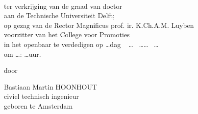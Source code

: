 \begin{titlepage}
  \begin{center}
    \hfill
    
    \vspace{2cm}
    
    \begingroup
    \color{Maroon} \\ \bigskip
    \endgroup
    
    \vfill
    
    
    \vfill
    
    ter verkrijging van de graad van doctor \\
    aan de Technische Universiteit Delft; \\
    op gezag van de Rector Magnificus prof. ir. K.Ch.A.M. Luyben \\
    voorzitter van het College voor Promoties \\
    in het openbaar te verdedigen op \dots dag ~ \dots ~ \dots\dots ~ \dots \\
    om \dots : \dots uur.
    
    \vfill
    
    door
    
    \vfill
    
    Bastiaan Martin HOONHOUT \\
    civiel technisch ingenieur \\
    geboren te Amsterdam
    
    \vfill                      
    
  \end{center}  
\end{titlepage}

